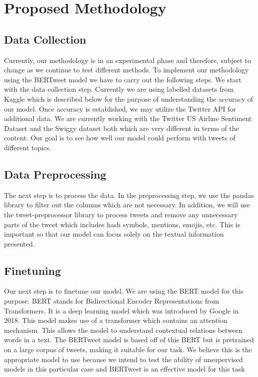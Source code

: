 \documentclass[conference]{IEEEtran}
\begin{document}
\section{Proposed Methodology}
\subsection{Data Collection}
Currently, our methodology is in an experimental phase and therefore, subject to change as we continue to test different methods. To implement our methodology using the BERTweet model we have to carry out the following steps. We start with the data collection step. Currently we are using labelled datasets from Kaggle which is described below for the purpose of understanding the accuracy of our model. Once accuracy is established, we may utilize the Twitter API for additional data. We are currently working with the Twitter US Airline Sentiment Dataset and the Swiggy dataset both which are very different in terms of the content. Our goal is to see how well our model could perform with tweets of different topics. 

\subsection{Data Preprocessing}
The next step is to process the data. In the preprocessing step, we use the pandas library to filter out the columns which are not necessary.  In addition, we will use the tweet-preprocessor library to process tweets and remove any unnecessary parts of the tweet which includes hash symbols, mentions, emojis, etc. This is important so that our model can focus solely on the textual information presented. 

\subsection{Finetuning}
Our next step is to finetune our model. We are using the BERT model for this purpose. BERT stands for Bidirectional Encoder Representations from Transformers. It is a deep learning model which was introduced by Google in 2018. This model makes use of a transformer which contains an attention mechanism. This allows the model to understand contextual relations between words in a text. The BERTweet model is based off of this BERT but is pretrained on a large corpus of tweets, making it suitable for our task. We believe this is the appropriate model to use because we intend to test the ability of unsupervised models in this particular case and BERTweet is an effective model for this task
\end{document}
